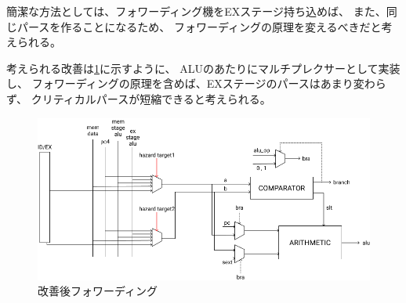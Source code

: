 \documentclass[../main.tex]{subfiles}
\begin{document}
        簡潔な方法としては、フォワーディング機をEXステージ持ち込めば、
        また、同じパースを作ることになるため、
        フォワーディングの原理を変えるべきだと考えられる。

        考えられる改善は\ref{fig:forwardingImprove}に示すように、
        ALUのあたりにマルチプレクサーとして実装し、
        フォワーディングの原理を含めば、EXステージのパースはあまり変わらず、
        クリティカルパースが短縮できると考えられる。

        \begin{figure}[htp]
            \centering
            \includegraphics*[scale = 0.8]{../images/forwarding_improved.png}
            \caption{改善後フォワーディング}
            \label{fig:forwardingImprove}
        \end{figure}
\end{document}
